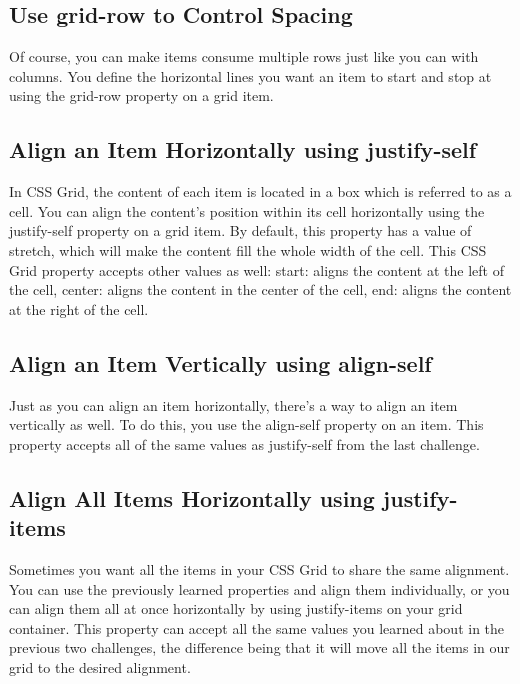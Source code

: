 \documentclass{article}%
\begin{document}
%
\subsection{Use grid{-}row to Control Spacing}%
\label{subsec:Usegrid{-}rowtoControlSpacing}%
Of course, you can make items consume multiple rows just like you can with columns. You define the horizontal lines you want an item to start and stop at using the grid{-}row property on a grid item.\newline%

%
\subsection{Align an Item Horizontally using justify{-}self}%
\label{subsec:AlignanItemHorizontallyusingjustify{-}self}%
In CSS Grid, the content of each item is located in a box which is referred to as a cell. You can align the content's position within its cell horizontally using the justify{-}self property on a grid item. By default, this property has a value of stretch, which will make the content fill the whole width of the cell. This CSS Grid property accepts other values as well:\newline%
start: aligns the content at the left of the cell,\newline%
center: aligns the content in the center of the cell,\newline%
end: aligns the content at the right of the cell.\newline%

%
\subsection{Align an Item Vertically using align{-}self}%
\label{subsec:AlignanItemVerticallyusingalign{-}self}%
Just as you can align an item horizontally, there's a way to align an item vertically as well. To do this, you use the align{-}self property on an item. This property accepts all of the same values as justify{-}self from the last challenge.\newline%

%
\subsection{Align All Items Horizontally using justify{-}items}%
\label{subsec:AlignAllItemsHorizontallyusingjustify{-}items}%
Sometimes you want all the items in your CSS Grid to share the same alignment. You can use the previously learned properties and align them individually, or you can align them all at once horizontally by using justify{-}items on your grid container. This property can accept all the same values you learned about in the previous two challenges, the difference being that it will move all the items in our grid to the desired alignment.\newline%
\end{document}
